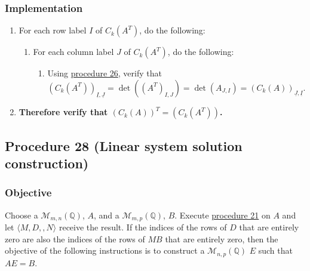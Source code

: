 \documentclass[twocolumn]{article}
\newcommand{\ul}[1]{\underline{#1}}
\begin{document}
			\subsubsection{Implementation}
				\begin{enumerate}
					\item For each row label $I$ of $C_k(A^T)$, do the following:
					\begin{enumerate}
						\item For each column label $J$ of $C_k(A^T)$, do the following:
						\begin{enumerate}
							\item Using \hyperref[sec:procedure 26]{procedure 26}, verify that $(C_k(A^T))_{\ul{I},\ul{J}}=\det((A^T)_{I,J})=\det(A_{J,I})=(C_k(A))_{\ul{J},\ul{I}}$.
						\end{enumerate}
					\end{enumerate}
					\item \textbf{Therefore verify that $(C_k(A))^T=(C_k(A^T))$.}
				\end{enumerate}
		\subsection{Procedure 28 (Linear system solution construction)}\label{sec:procedure 28}
			\subsubsection{Objective}
				Choose a $\mathcal{M}_{m,n}(\mathbb{Q})$, $A$, and a $\mathcal{M}_{m,p}(\mathbb{Q})$, $B$. Execute \hyperref[sec:procedure 21]{procedure 21} on $A$ and let $\langle M,D,,N\rangle$ receive the result. If the indices of the rows of $D$ that are entirely zero are also the indices of the rows of $MB$ that are entirely zero, then the objective of the following instructions is to construct a $\mathcal{M}_{n,p}(\mathbb{Q})$ $E$ such that $AE=B$.
\end{document}
